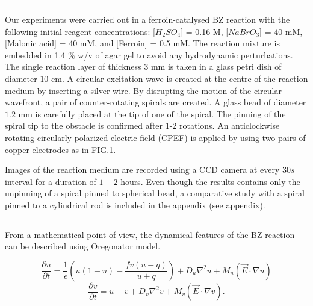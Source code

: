 \documentclass[%
 preprint,
 amsmath,amssymb,
 aps,
]{revtex4-2}
\begin{document}
\vspace{5pt}
\hrule
\vspace{5pt}



Our experiments were carried out in a ferroin-catalysed BZ reaction with the following initial reagent concentrations: [$H_2SO_4$] = 0.16 M, [$NaBrO_3$] = 40 mM, [Malonic acid] = 40 mM, and [Ferroin] = 0.5 mM. The reaction mixture is embedded in 1.4 $\%$ w/v of agar gel to avoid any hydrodynamic perturbations. The single reaction layer of thickness $3$ mm is taken in a glass petri dish of diameter $10$ cm. 
A circular excitation wave is created at the centre of the reaction medium by inserting a silver wire. By disrupting the motion of the circular wavefront, a pair of counter-rotating spirals are created. A glass bead of diameter $1.2$ mm is carefully placed at the tip of one of the spiral. The pinning of the spiral tip to the obstacle is confirmed after 1-2 rotations.
An anticlockwise rotating circularly polarized electric field (CPEF) is applied by using two pairs of copper electrodes as in FIG.1. 

Images of the reaction medium are recorded using a CCD camera at every $30 s$ interval for a duration of $1-2$ hours. Even though the results contains only the unpinning of a spiral pinned to spherical bead, a comparative study with a spiral pinned to a cylindrical rod is included in the appendix (see appendix).

\vspace{5pt}
\hrule
\vspace{5pt}

From a mathematical point of view, the dynamical features of the BZ reaction can be described using Oregonator model. 

\begin{equation}\label{E_uoregonator}
\frac{\partial u}{\partial t}=\frac{1}{\epsilon}(u(1-u)-\frac{fv(u-q)}{u+q})
+D_{u}\nabla^2u+M_{u}(\vec{E} \cdot \nabla u)
\end{equation}
\begin{equation}\label{E_voregonator}
\frac{\partial v}{\partial t}=u-v+D_{v}\nabla^2v+M_{v}(\vec{E} \cdot \nabla v).
\end{equation}
\end{document}
